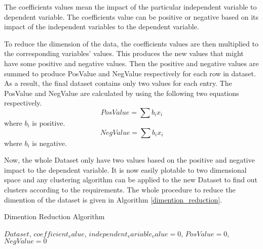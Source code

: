 \documentclass[12pt]{report}
\begin{document}
The coefficients values mean the impact of the particular independent variable to dependent variable. The coefficients value can be positive or negative based on its impact of the independent variables to the dependent variable. 
 
To reduce the dimension of the data, the coefficients values are then multiplied to the corresponding variables' values. This produces the new values that might have some positive and negative values. Then the positive and negative values are summed to produce PosValue and NegValue respectively for each row in dataset. As a result, the final dataset contains only two values for each entry. The PosValue and NegValue are calculated by using the following two equations respectively. 
\begin{equation}
\label{eq:PosValue}
 PosValue=\sum{b_{i}x_{i}}
\end{equation} 
where $b_{i}$ is positive.
\begin{equation}
\label{eq:NegValue}
NegValue=\sum{b_{i}x_{i}}
\end{equation}
where $b_{i}$ is negative.

Now, the whole Dataset only have two values based on the positive and negative impact to the dependent variable. It is now easily plotable to two dimensional space and any clustering algorithm can be applied to the new Dataset to find out clusters according to the requirements. The whole procedure to reduce the dimention of the dataset is given in Algorithm \ref{dimention_reduction}.


\begin{algorithm}
\caption{Dimention Reduction Algorithm}
\label{dimention_reduction}
\begin{algorithmic}[1]
\REQUIRE  $ Dataset$, $coefficient_value$, $independent_variable_value=0$, $PosValue=0$,$NegValue=0$ 
		
				
							\ELSE
									
							\ENDIF
				\ENDFOR
				
		\ENDFOR
		

\end{algorithmic}
\end{algorithm}
\end{document}
